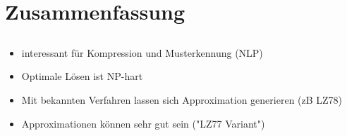 \section{Zusammenfassung}
\subsection{}


\begin{frame}{\FrameName}
    \begin{itemize}[<+->]
      \item interessant für Kompression und Musterkennung (NLP)
      \item Optimale Lösen ist NP-hart
      \item Mit bekannten Verfahren lassen sich Approximation generieren (zB LZ78)
      \item Approximationen können sehr gut sein ("LZ77 Variant")
    \end{itemize}

  \end{frame}